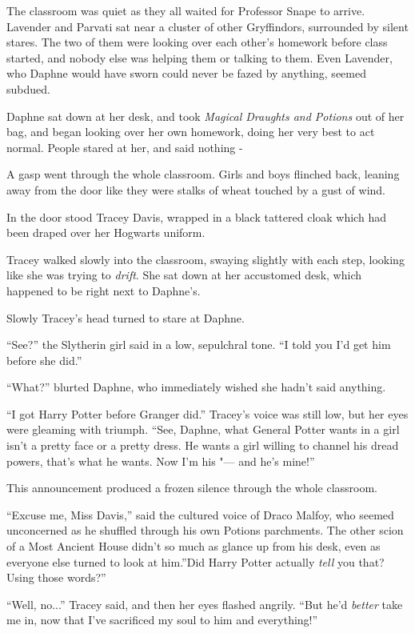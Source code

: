 The classroom was quiet as they all waited for Professor Snape to
arrive. Lavender and Parvati sat near a cluster of other Gryffindors,
surrounded by silent stares. The two of them were looking over each
other's homework before class started, and nobody else was helping them
or talking to them. Even Lavender, who Daphne would have sworn could
never be fazed by anything, seemed subdued.

Daphne sat down at her desk, and took \emph{Magical Draughts and
Potions} out of her bag, and began looking over her own homework, doing
her very best to act normal. People stared at her, and said nothing -

A gasp went through the whole classroom. Girls and boys flinched back,
leaning away from the door like they were stalks of wheat touched by a
gust of wind.

In the door stood Tracey Davis, wrapped in a black tattered cloak which
had been draped over her Hogwarts uniform.

Tracey walked slowly into the classroom, swaying slightly with each
step, looking like she was trying to \emph{drift}. She sat down at her
accustomed desk, which happened to be right next to Daphne's.

Slowly Tracey's head turned to stare at Daphne.

``See?'' the Slytherin girl said in a low, sepulchral tone. ``I told you
I'd get him before she did.''

``What?'' blurted Daphne, who immediately wished she hadn't said
anything.

``I got Harry Potter before Granger did.'' Tracey's voice was still low,
but her eyes were gleaming with triumph. ``See, Daphne, what General
Potter wants in a girl isn't a pretty face or a pretty dress. He wants a
girl willing to channel his dread powers, that's what he wants. Now I'm
his "--- and he's mine!''

This announcement produced a frozen silence through the whole classroom.

``Excuse me, Miss Davis,'' said the cultured voice of Draco Malfoy, who
seemed unconcerned as he shuffled through his own Potions parchments.
The other scion of a Most Ancient House didn't so much as glance up from
his desk, even as everyone else turned to look at him.''Did Harry Potter
actually \emph{tell} you that? Using those words?''

``Well, no...'' Tracey said, and then her eyes flashed angrily.
``But he'd \emph{better} take me in, now that I've sacrificed my soul to
him and everything!''

